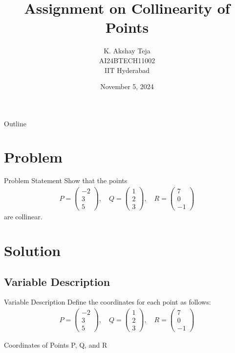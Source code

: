 \documentclass{beamer}
\title{Assignment on Collinearity of Points}
\author{K. Akshay Teja \\ AI24BTECH11002\\IIT Hyderabad}
\date{November 5, 2024}
\theoremstyle{remark}
\numberwithin{equation}{section}
\begin{document}
\begin{frame}
    \titlepage
\end{frame}


\begin{frame}{Outline}
    \tableofcontents
\end{frame}


\section{Problem}
\begin{frame}{Problem Statement}
    Show that the points 
    \begin{align}
    P = \begin{pmatrix} -2 \\ 3 \\ 5 \end{pmatrix}, \quad Q = \begin{pmatrix} 1 \\ 2 \\ 3 \end{pmatrix}, \quad R = \begin{pmatrix} 7 \\ 0 \\ -1 \end{pmatrix}
    \end{align}
    are collinear.
\end{frame}


\section{Solution}


\subsection{Variable Description}
\begin{frame}{Variable Description}
    Define the coordinates for each point as follows:
    \begin{align}
    P = \begin{pmatrix} -2 \\ 3 \\ 5 \end{pmatrix}, \quad Q = \begin{pmatrix} 1 \\ 2 \\ 3 \end{pmatrix}, \quad R = \begin{pmatrix} 7 \\ 0 \\ -1 \end{pmatrix}
    \end{align}
    \begin{table}[h!]
        \centering
	
        \caption{Coordinates of Points P, Q, and R}
    \end{table}
\end{frame}
\end{document}
